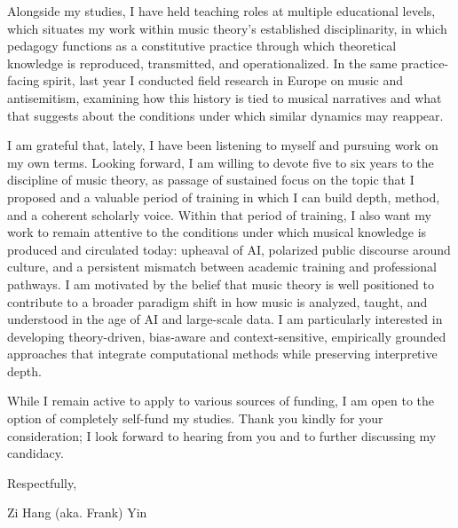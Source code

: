 \documentclass[9pt]{article}
\begin{document}
Alongside my studies, I have held teaching roles at multiple educational levels, which situates my work within music theory’s established disciplinarity, in which pedagogy functions as a constitutive practice through which theoretical knowledge is reproduced, transmitted, and operationalized. In the same practice-facing spirit, last year I conducted field research in Europe on music and antisemitism, examining how this history is tied to musical narratives and what that suggests about the conditions under which similar dynamics may reappear.


I am grateful that, lately, I have been listening to myself and pursuing work on my own terms. Looking forward, I am willing to devote five to six years to the discipline of music theory, as passage of sustained focus on the topic that I proposed and a valuable period of training in which I can build depth, method, and a coherent scholarly voice. Within that period of training, I also want my work to remain attentive to the conditions under which musical knowledge is produced and circulated today: upheaval of AI, polarized public discourse around culture, and a persistent mismatch between academic training and professional pathways. I am motivated by the belief that music theory is well positioned to contribute to a broader paradigm shift in how music is analyzed, taught, and understood in the age of AI and large-scale data. I am particularly interested in developing theory-driven, bias-aware and context-sensitive, empirically grounded approaches that integrate computational methods while preserving interpretive depth.


While I remain active to apply to various sources of funding, I am open to the option of completely self-fund my studies. Thank you kindly for your consideration; I look forward to hearing from you and to further discussing my candidacy.    

\bigskip

\noindent Respectfully,

\bigskip

\noindent Zi Hang (aka. Frank) Yin 
\end{document}
